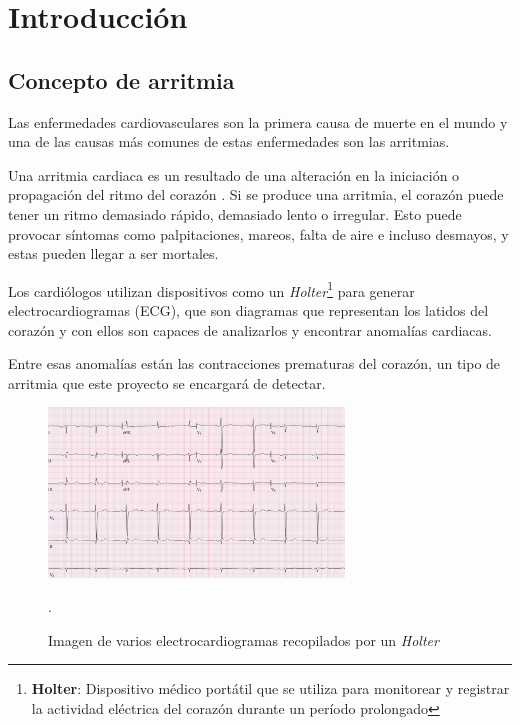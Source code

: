 \titlespacing*{\chapter}{0pt}{-1.25cm}{25pt}
\chapter{Introducción}
\section{Concepto de arritmia}
Las enfermedades cardiovasculares son la primera causa de muerte en el mundo \cite{roth2020global} y una de las causas más comunes de estas enfermedades son las arritmias.

Una arritmia cardiaca es un resultado de una alteración en la iniciación o propagación del ritmo del corazón \cite{velez}. Si se produce una arritmia, el corazón puede tener un ritmo demasiado rápido, demasiado lento o irregular. Esto puede provocar síntomas como palpitaciones, mareos, falta de aire e incluso desmayos, y estas pueden llegar a ser mortales.

Los cardiólogos utilizan dispositivos como un \textit{Holter}\footnote{\textbf{Holter}: Dispositivo médico portátil que se utiliza para monitorear y registrar la actividad eléctrica del corazón durante un período prolongado} para generar electrocardiogramas (ECG), que son diagramas que representan los latidos del corazón y con ellos son capaces de analizarlos y encontrar anomalías cardiacas.

Entre esas anomalías están las contracciones prematuras del corazón, un tipo de arritmia que este proyecto se encargará de detectar. 

\begin{figure}[h!]
	\centering
	\includegraphics[width=0.7\textwidth]{./Images/img_introduccion/electrocardiograma.png}
	\caption{Imagen de varios electrocardiogramas recopilados por un \textit{Holter} \cite{fotoElectrocardiograma}}.
	\label{fig:electrocardiogramas}
\end{figure}


